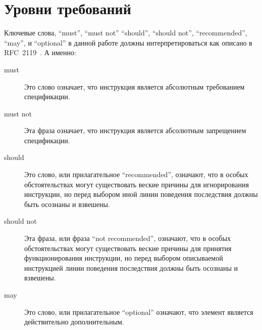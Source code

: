 \chapter{Уровни требований}
\label{requirementchapter}

Ключевые слова, ``must'', ``must not'' ``should'', ``should not'', ``recommended'',
``may'', и ``optional'' в данной работе должны интерпретироваться как описано в RFC~2119~\cite
{mustard}. А именно:

\begin{description}
\item[must] Это слово означает, что инструкция является абсолютным требованием
  спецификации.
\item[must not] Эта фраза означает, что инструкция является абсолютным запрещением
  спецификации.
\item[should] Это слово, или прилагательное ``recommended'', означают, что
  в особых обстоятельствах могут существовать веские причины для игнорирования инструкции, но перед
  выбором иной линии поведения последствия должны быть осознаны и взвешены.
\item[should not] Эта фраза, или фраза ``not recommended'', означают, что
  в особых обстоятельствах могут существовать веские причины для принятия функционирования
  инструкции, но перед выбором описываемой инструкцией линии поведения последствия
  должны быть осознаны и взвешены.
\item[may] Это слово, или прилагательное ``optional'' означают, что
  элемент является действительно дополнительным.
\end{description}


